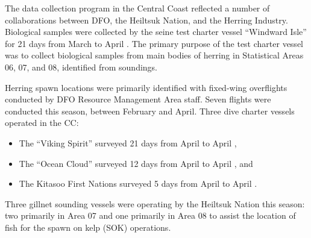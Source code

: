 The data collection program in the Central Coast reflected a number of collaborations between DFO, the Heiltsuk Nation, and the Herring Industry.
Biological samples were collected by the seine test charter vessel ``Windward Isle'' for 21 days from March  to April .
The primary purpose of the test charter vessel was to collect biological samples from main bodies of herring in Statistical Areas 06, 07, and 08, identified from soundings.
 
Herring spawn locations were primarily identified with fixed-wing overflights conducted by DFO Resource Management Area staff.
Seven flights were conducted this season, between February and April.
Three dive charter vessels operated in the CC:
\begin{itemize}
\item The ``Viking Spirit'' surveyed 21 days from April  to April ,
\item The ``Ocean Cloud'' surveyed 12 days from April  to April , and
\item The Kitasoo First Nations surveyed 5 days from April  to April .
\end{itemize}
Three gillnet sounding vessels were operating by the Heiltsuk Nation this season: two primarily in Area 07 and one primarily in Area 08 to assist the location of fish for the spawn on kelp (SOK) operations.